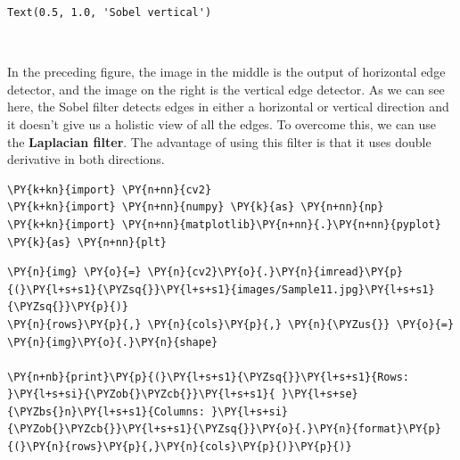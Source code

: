 \begin{tcolorbox}[breakable, size=fbox, boxrule=.5pt, pad at break*=1mm, opacityfill=0]
	\begin{Verbatim}[commandchars=\\\{\}]
Text(0.5, 1.0, 'Sobel vertical')
	\end{Verbatim}
\end{tcolorbox}

\begin{center}
\end{center}
{ \hspace*{\fill} \\}

In the preceding figure, the image in the middle is the output of horizontal edge detector, and the image on the right is the vertical edge detector. As we can see here, the Sobel filter detects edges in either a horizontal or vertical direction and it doesn't give us a holistic view of all the edges. To overcome this, we can use the \textbf{Laplacian filter}. The advantage of using this filter is that it uses double derivative in both directions.

\vspace{0.5cm}

\begin{tcolorbox}[breakable, size=fbox, boxrule=1pt, pad at break*=1mm,colback=cellbackground, colframe=cellborder]
	\begin{Verbatim}[commandchars=\\\{\}]
\PY{k+kn}{import} \PY{n+nn}{cv2}
\PY{k+kn}{import} \PY{n+nn}{numpy} \PY{k}{as} \PY{n+nn}{np}
\PY{k+kn}{import} \PY{n+nn}{matplotlib}\PY{n+nn}{.}\PY{n+nn}{pyplot} \PY{k}{as} \PY{n+nn}{plt}
	\end{Verbatim}
\end{tcolorbox}

\begin{tcolorbox}[breakable, size=fbox, boxrule=1pt, pad at break*=1mm,colback=cellbackground, colframe=cellborder]
\begin{Verbatim}[commandchars=\\\{\}]
\PY{n}{img} \PY{o}{=} \PY{n}{cv2}\PY{o}{.}\PY{n}{imread}\PY{p}{(}\PY{l+s+s1}{\PYZsq{}}\PY{l+s+s1}{images/Sample11.jpg}\PY{l+s+s1}{\PYZsq{}}\PY{p}{)}
\PY{n}{rows}\PY{p}{,} \PY{n}{cols}\PY{p}{,} \PY{n}{\PYZus{}} \PY{o}{=} \PY{n}{img}\PY{o}{.}\PY{n}{shape}

\PY{n+nb}{print}\PY{p}{(}\PY{l+s+s1}{\PYZsq{}}\PY{l+s+s1}{Rows: }\PY{l+s+si}{\PYZob{}\PYZcb{}}\PY{l+s+s1}{ }\PY{l+s+se}{\PYZbs{}n}\PY{l+s+s1}{Columns: }\PY{l+s+si}{\PYZob{}\PYZcb{}}\PY{l+s+s1}{\PYZsq{}}\PY{o}{.}\PY{n}{format}\PY{p}{(}\PY{n}{rows}\PY{p}{,}\PY{n}{cols}\PY{p}{)}\PY{p}{)}
\end{Verbatim}
\end{tcolorbox}

